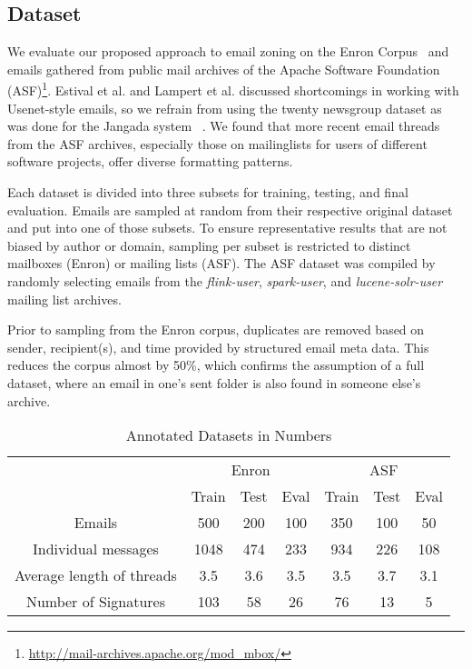 \documentclass{llncs}
\begin{document}
\subsection{Dataset}
We evaluate our proposed approach to email zoning on the Enron Corpus~\cite{enron} and emails gathered from public mail archives of the Apache Software Foundation (ASF)\footnote{\url{http://mail-archives.apache.org/mod\_mbox/}}. 
Estival et al. and Lampert et al. discussed shortcomings in working with Usenet-style emails, so we refrain from using the twenty newsgroup dataset as was done for the Jangada system ~\cite{profiling,zones,20news}.
We found that more recent email threads from the ASF archives, especially those on mailinglists for users of different software projects, offer diverse formatting patterns.

Each dataset is divided into three subsets for training, testing, and final evaluation.
Emails are sampled at random from their respective original dataset and put into one of those subsets.
To ensure representative results that are not biased by author or domain, sampling per subset is restricted to distinct mailboxes (Enron) or mailing lists (ASF).
The ASF dataset was compiled by randomly selecting emails from the \textit{flink-user}, \textit{spark-user}, and \textit{lucene-solr-user} mailing list archives.

Prior to sampling from the Enron corpus, duplicates are removed based on sender, recipient(s), and time provided by structured email meta data.
This reduces the corpus almost by 50\%, which confirms the assumption of a full dataset, where an email in one's sent folder is also found in someone else's archive.

\begin{table}
	\caption{Annotated Datasets in Numbers}
	\label{tab:dataset}
	\centering
	\begin{tabular*}{\textwidth}{@{\extracolsep{\fill}} ccccccc}
		\toprule
		& \multicolumn{3}{c}{Enron} &  \multicolumn{3}{c}{ASF} \\
		\cmidrule{2-4}
		\cmidrule{5-7}
		                          & Train    & Test   & Eval   & Train   & Test   & Eval  \\
		\midrule
		Emails                    & 500      & 200    & 100    &  350   &  100   &   50   \\
		Individual messages       & 1048     & 474    & 233    &  934   &  226   &   108  \\
		Average length of threads & 3.5      & 3.6    & 3.5    &  3.5   &  3.7   &   3.1  \\
		Number of Signatures      & 103      & 58     & 26     &  76    &  13    &   5    \\
		\bottomrule
	\end{tabular*}
\end{table}
\end{document}
